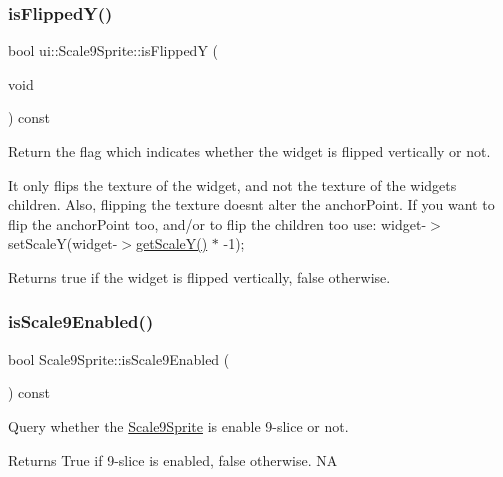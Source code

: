 \subsubsection{\texorpdfstring{is\+Flipped\+Y()}{isFlippedY()}}
{\footnotesize\ttfamily bool ui\+::\+Scale9\+Sprite\+::is\+FlippedY (\begin{DoxyParamCaption}\item[{void}]{ }\end{DoxyParamCaption}) const\hspace{0.3cm}{\ttfamily [virtual]}}

Return the flag which indicates whether the widget is flipped vertically or not.

It only flips the texture of the widget, and not the texture of the widget\textquotesingle{}s children. Also, flipping the texture doesn\textquotesingle{}t alter the anchor\+Point. If you want to flip the anchor\+Point too, and/or to flip the children too use\+: widget-\/$>$set\+ScaleY(widget-\/$>$\hyperlink{classui_1_1Scale9Sprite_a7bab472ed47f8eb5d061120915f9c2d7}{get\+Scale\+Y()} $\ast$ -\/1);

\begin{DoxyReturn}{Returns}
true if the widget is flipped vertically, false otherwise. 
\end{DoxyReturn}
\mbox{\label{classui_1_1Scale9Sprite_a1bf8b2555d0f1b81d29bc44097a0c66d}} 
\subsubsection{\texorpdfstring{is\+Scale9\+Enabled()}{isScale9Enabled()}\hspace{0.1cm}{\footnotesize\ttfamily [1/2]}}
{\footnotesize\ttfamily bool Scale9\+Sprite\+::is\+Scale9\+Enabled (\begin{DoxyParamCaption}{ }\end{DoxyParamCaption}) const}



Query whether the \hyperlink{classui_1_1Scale9Sprite}{Scale9\+Sprite} is enable 9-\/slice or not. 

\begin{DoxyReturn}{Returns}
True if 9-\/slice is enabled, false otherwise.  NA 
\end{DoxyReturn}
\mbox{\label{classui_1_1Scale9Sprite_a226624d2403645ac803e0935c6caf9a7}} 
